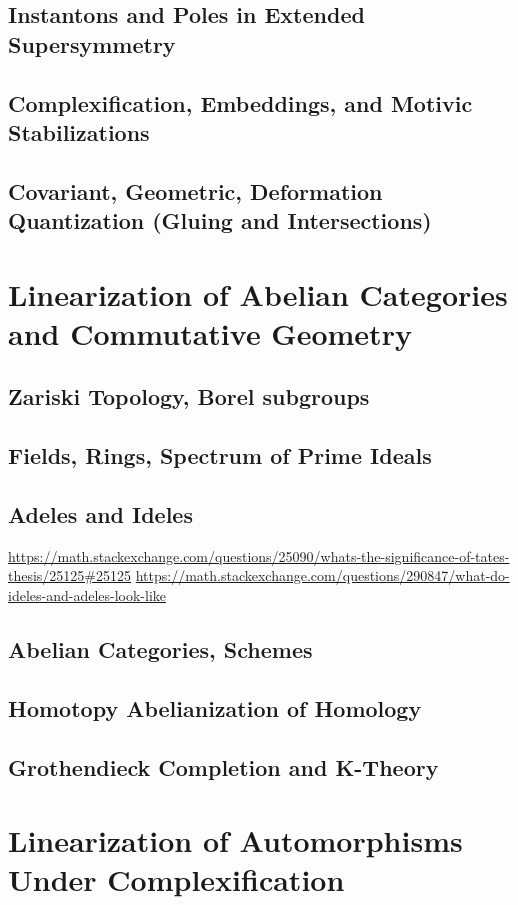 \documentclass{article}
\theoremstyle{definition}
\begin{document}
\subsection{Instantons and Poles in Extended Supersymmetry}
\subsection{Complexification, Embeddings, and Motivic Stabilizations}
\subsection{Covariant, Geometric, Deformation Quantization (Gluing and Intersections)}


\section{Linearization of Abelian Categories and Commutative Geometry}
    \subsection{Zariski Topology, Borel subgroups}
    \subsection{Fields, Rings, Spectrum of Prime Ideals}
    \subsection{Adeles and Ideles}
        \url{https://math.stackexchange.com/questions/25090/whats-the-significance-of-tates-thesis/25125#25125}
        \url{https://math.stackexchange.com/questions/290847/what-do-ideles-and-adeles-look-like}
    \subsection{Abelian Categories, Schemes}
    \subsection{Homotopy Abelianization of Homology}
    \subsection{Grothendieck Completion and K-Theory}

\section{Linearization of Automorphisms Under Complexification}
\end{document}
